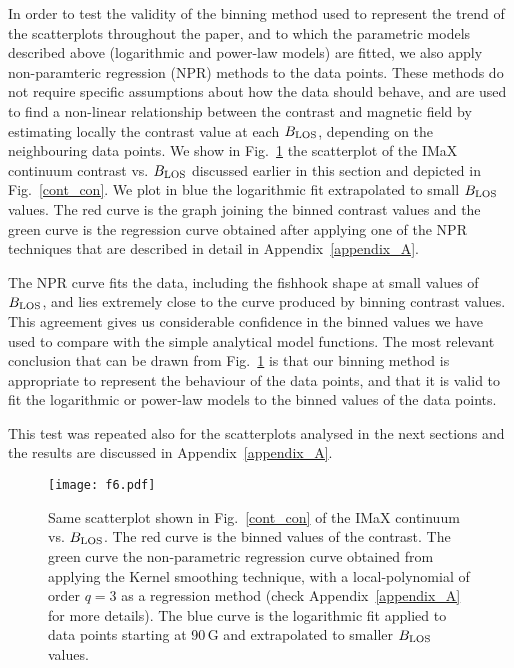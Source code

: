 \documentclass[goettingen, gauss, print]{thesis}
\begin{document}
In order to test the validity of the binning method used to represent the trend of the scatterplots throughout the paper, and to which the parametric models described above (logarithmic and power-law models) are fitted, we also apply non-paramteric regression (NPR) methods to the data points. These methods do not require specific assumptions about how the data should behave, and are used to find a non-linear relationship between the contrast and magnetic field by estimating locally the contrast value at each $B_{\rm LOS}$, depending on the neighbouring data points. We show in Fig.~\ref{bc_smooth} the scatterplot of the IMaX continuum contrast vs. $B_{\rm LOS}$ discussed earlier in this section and depicted in Fig.~\ref{cont_con}. We plot in blue the logarithmic fit extrapolated to small $B_{\rm LOS}$ values. The red curve is the graph joining the binned contrast values and the green curve  is the regression curve obtained after applying one of the NPR techniques that are described in detail in  Appendix~\ref{appendix_A}.

The NPR curve fits the data, including the fishhook shape at small values of $B_{\rm LOS}$, and lies extremely close to the curve produced by binning contrast values. This agreement gives us considerable confidence in the binned values we have used to compare with the simple analytical model functions.
The most relevant conclusion that can be drawn from Fig.~\ref{bc_smooth} is that our binning method is appropriate to represent the behaviour of the data points, and that it is valid to fit the logarithmic or power-law models to the binned values of the data points.

This test was repeated also for the scatterplots analysed in the next sections and the results are discussed in  Appendix~\ref{appendix_A}.

\begin{figure}
\centering
\texttt{[image: f6.pdf]}%
\caption{Same scatterplot shown in Fig.~\ref{cont_con} of the IMaX continuum vs. $B_{\rm LOS}$. The red curve is the binned values of the contrast. The green curve the non-parametric regression curve obtained from applying the Kernel smoothing technique, with a local-polynomial of order $q=3$ as a regression method (check Appendix~\ref{appendix_A} for more details). The blue curve is the logarithmic fit applied to data points starting at 90\,G and extrapolated to smaller $B_{\rm LOS}$ values.}
\label{bc_smooth}
\end{figure}
\end{document}
